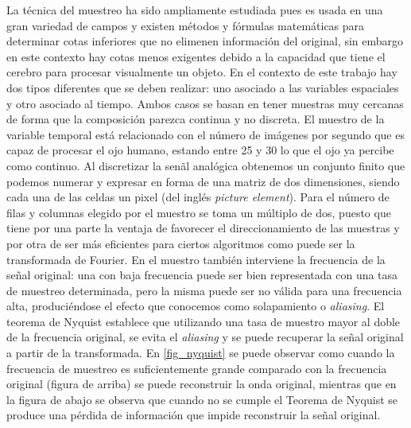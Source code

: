 La técnica del muestreo ha sido ampliamente estudiada pues es usada en una gran variedad de campos y existen métodos y fórmulas matemáticas para determinar cotas inferiores que no elimenen información del original, sin embargo en este contexto hay cotas menos exigentes debido a la capacidad que tiene el cerebro para procesar visualmente un objeto. 
En el contexto de este trabajo hay dos tipos diferentes que se deben realizar: uno asociado a las variables espaciales y otro asociado al tiempo. Ambos casos se basan en tener muestras muy cercanas de forma que la composición parezca continua y no discreta.
El muestro de la variable temporal está relacionado con el número de imágenes por segundo que es capaz de procesar el ojo humano, estando entre 25 y 30 lo que el ojo ya percibe como continuo.
Al discretizar la sen\~al analógica obtenemos un conjunto finito que podemos numerar y expresar en forma de una matriz de dos dimensiones, siendo cada una de las celdas un pixel (del inglés \textit{picture element}). Para el número de filas y columnas elegido por el muestro se toma un múltiplo de dos, puesto que tiene por una parte la ventaja de favorecer el direccionamiento de las muestras y por otra de ser más eficientes para ciertos algoritmos como puede ser la transformada de Fourier.
En el muestro también interviene la frecuencia de la se\~nal original: una con baja frecuencia puede ser bien representada con una tasa de muestreo determinada, pero la misma puede ser no válida para una frecuencia alta, produciéndose el efecto que conocemos como solapamiento o \textit{aliasing}. El teorema de Nyquist establece que utilizando una tasa de muestro mayor al doble de la frecuencia original, se evita el \textit{aliasing} y se puede recuperar la se\~nal original a partir de la transformada. En \ref{fig_nyquist} se puede observar como cuando la frecuencia de muestreo es suficientemente grande comparado con la frecuencia original (figura de arriba) se puede reconstruir la onda original, mientras que en la figura de abajo se observa que cuando no se cumple el Teorema de Nyquist se produce una pérdida de información que impide reconstruir la se\~nal original\cite{b3:2012}.


